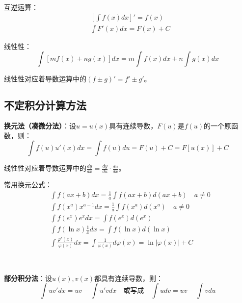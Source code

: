 互逆运算：
\begin{align*}
&\left[ \int{f\left( x \right) dx} \right] '=f\left( x \right) \\
&\int{F'\left( x \right) dx}=F\left( x \right) +C
\end{align*}

线性性：
\[
\int{\left[ mf\left( x \right) +ng\left( x \right) \right] dx}=m\int{f\left( x \right) dx}+n\int{g\left( x \right) dx}
\]

\begin{tcolorbox}
线性性对应着导数运算中的$\left( f\pm g \right) '=f'\pm g'$。
\end{tcolorbox}

\subsection{不定积分计算方法}

{\bf 换元法（凑微分法）}：设$u=u\left( x \right) $具有连续导数，$F\left( u \right) $是$f\left( u \right) $的一个原函数，则：
\[
\int{f\left( u \right) u'\left( x \right) dx}=\int{f\left( u \right) du}=F\left( u \right) +C=F\left[ u\left( x \right) \right] +C
\]

\begin{tcolorbox}
线性性对应着导数运算中的$\frac{dy}{dx}=\frac{dy}{du}\cdot \frac{du}{dx}$。
\end{tcolorbox}

常用换元公式：
\begin{align*}
&\int{f\left( ax+b \right) dx}=\frac{1}{a}\int{f\left( ax+b \right) d\left( ax+b \right)} \quad a\ne 0 \\
&\int{f\left( x^a \right) x^{a-1}dx}=\frac{1}{a}\int{f\left( x^a \right) d\left( x^a \right)} \quad a\ne 0 \\
&\int{f\left( e^x \right) e^xdx}=\int{f\left( e^x \right) d\left( e^x \right)} \\
&\int{f\left( \ln x \right) \frac{1}{x}dx}=\int{f\left( \ln x \right) d\left( \ln x \right)} \\
&\int{\frac{\varphi '\left( x \right)}{\varphi \left( x \right)}dx}=\int{\frac{1}{\varphi \left( x \right)}d\varphi \left( x \right)}=\ln \left| \varphi \left( x \right) \right|+C
\end{align*}

~

{\bf 部分积分法}：设$u\left( x \right) ,v\left( x \right) $都具有连续导数，则：
\[
\int{uv'dx}=uv-\int{u'vdx} \quad \text{或写成} \quad \int{udv}=uv-\int{vdu}
\]


